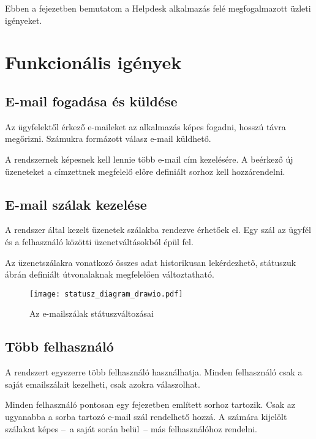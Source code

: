 Ebben a fejezetben bemutatom a \foreignlanguage{british}{Helpdesk} alkalmazás felé megfogalmazott üzleti igényeket.



\section{Funkcionális igények}

\subsection{E-mail fogadása és küldése}\label{sec:email_fogadas_kuldes}
Az ügyfelektől érkező e-maileket az alkalmazás képes fogadni, hosszú távra megőrizni. Számukra formázott válasz e-mail küldhető.

A rendszernek képesnek kell lennie több e-mail cím kezelésére. A beérkező új üzeneteket a címzettnek megfelelő előre definiált sorhoz kell hozzárendelni.



\subsection{E-mail szálak kezelése}
A rendszer által kezelt üzenetek szálakba rendezve érhetőek el. Egy szál az ügyfél és a felhasználó közötti üzenetváltásokból épül fel.

Az üzenetszálakra vonatkozó összes adat historikusan lekérdezhető, státuszuk  ábrán definiált útvonalaknak megfelelően változtatható.  

\begin{figure}[hbt] 
	\centering
	\texttt{[image: statusz\_diagram\_drawio.pdf]}
	\caption{Az e-mailszálak státuszváltozásai}
	\label{fig:statusz_diagram}
\end{figure}



\subsection{Több felhasználó}\label{sec:tobb_felhasznalo}
A rendszert egyszerre több felhasználó használhatja. Minden felhasználó csak a saját emailszálait kezelheti, csak azokra válaszolhat.

	
Minden felhasználó pontosan egy  fejezetben említett sorhoz tartozik. Csak az ugyanabba a sorba tartozó e-mail szál rendelhető hozzá.
A számára kijelölt szálakat képes --~a saját során belül~--  más felhasználóhoz rendelni. 

